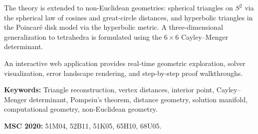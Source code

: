 The theory is extended to non-Euclidean geometries: spherical triangles on $S^2$ via the spherical law of cosines and great-circle distances, and hyperbolic triangles in the Poincar\'e disk model via the hyperbolic metric. A three-dimensional generalization to tetrahedra is formulated using the $6 \times 6$ Cayley--Menger determinant.

An interactive web application provides real-time geometric exploration, solver visualization, error landscape rendering, and step-by-step proof walkthroughs.

\medskip
\noindent\textbf{Keywords:} Triangle reconstruction, vertex distances, interior point, Cayley--Menger determinant, Pompeiu's theorem, distance geometry, solution manifold, computational geometry, non-Euclidean geometry.

\noindent\textbf{MSC 2020:} 51M04, 52B11, 51K05, 65H10, 68U05.
